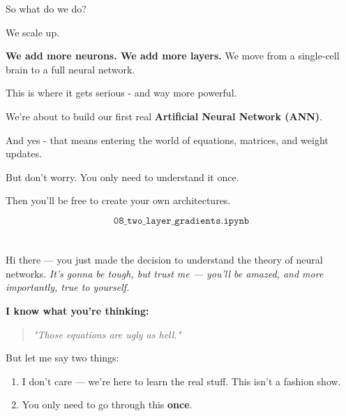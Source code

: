 \documentclass[11pt]{article}
\begin{document}
So what do we do?

We scale up.

\begin{tcolorbox}[colback=white!98!gray, colframe=gray!30!black, arc=1mm]
\textbf{We add more neurons. We add more layers.}  
We move from a single-cell brain to a full neural network.
\end{tcolorbox}

This is where it gets serious - and way more powerful.

We're about to build our first real \textbf{Artificial Neural Network (ANN)}.

\begin{center}
\end{center}

\vspace{0.5em}

And yes - that means entering the world of equations, matrices, and weight updates.

But don't worry. You only need to understand it once.

Then you'll be free to create your own architectures.

\newpage
{}
\label{sec:theory_02}
\[
\texttt{08\_two\_layer\_gradients.ipynb}
\]

\vspace{1.5em}

\section*{}

Hi there — you just made the decision to understand the theory of neural networks.  
\textit{It’s gonna be tough, but trust me — you’ll be amazed, and more importantly, true to yourself.}

\vspace{1em}

\begin{tcolorbox}[colback=gray!10, colframe=black, title=Final Message of This Notebook]
\textbf{I know what you're thinking:}
\begin{quote}
\textit{"Those equations are ugly as hell."}
\end{quote}

But let me say two things:

\begin{enumerate}[label=\textbf{\arabic*.}]
  \item I don't care — we’re here to learn the real stuff. This isn’t a fashion show.
  \item You only need to go through this \textbf{once}.
\end{enumerate}
\end{tcolorbox}
\end{document}
